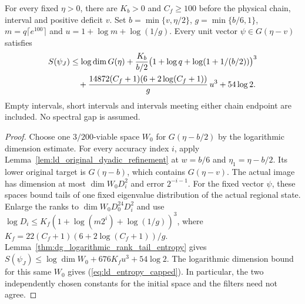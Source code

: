 \begin{lemma}
    \label{lem:ld_entropy_capped_costs}
    \leanok
    For every fixed $\eta>0$, there are $K_b>0$ and $C_f\ge100$
    before the physical chain, interval and positive deficit $v$.
    Set $b=\min\{v,\eta/2\}$, $g=\min\{b/6,1\}$,
    $m=q\lceil e^{100}\rceil$ and $u=1+\log m+\log(1/g)$.
    Every unit vector $\psi\in G(\eta-v)$ satisfies
    \begin{align}
        S(\psi_J) & \le\log\dim G(\eta)
        +\frac{K_b}{b/2}
        \bigl(1+\log q+\log(1+1/(b/2))\bigr)^3\notag                  \\
                  & \quad+\frac{14872(C_f+1)(6+2\log(C_f+1))}{g}\,u^3
        +54\log2.
        \label{eq:ld_entropy_capped}
    \end{align}
    Empty intervals, short intervals and intervals meeting either chain
    endpoint are included. No spectral gap is assumed.
\end{lemma}
\begin{proof}\leanok
    Choose one $3/200$-viable space $W_0$ for $G(\eta-b/2)$ by the
    logarithmic dimension estimate. For every accuracy index $i$, apply
    Lemma~\ref{lem:ld_original_dyadic_refinement} at $w=b/6$ and
    $\eta_1=\eta-b/2$. Its lower original target is $G(\eta-b)$,
    which contains $G(\eta-v)$. The actual image has dimension at most
    $\dim W_0D_i^2$ and error $2^{-i-1}$.
    For the fixed vector $\psi$, these spaces bound tails of one fixed
    eigenvalue distribution of the actual regional state. Enlarge the
    ranks to $\dim W_0D_0^{24}D_i^2$ and use
    $\log D_i\le K_f(1+\log(m2^i)+\log(1/g))^3$, where
    $K_f=22(C_f+1)(6+2\log(C_f+1))/g$.
    Lemma~\ref{thm:dg_logarithmic_rank_tail_entropy} gives
    $S(\psi_J)\le\log\dim W_0+676K_fu^3+54\log2$.
    The logarithmic dimension bound for this same $W_0$ gives
    (\ref{eq:ld_entropy_capped}). In particular, the two independently
    chosen constants for the initial space and the filters need not agree.
\end{proof}


